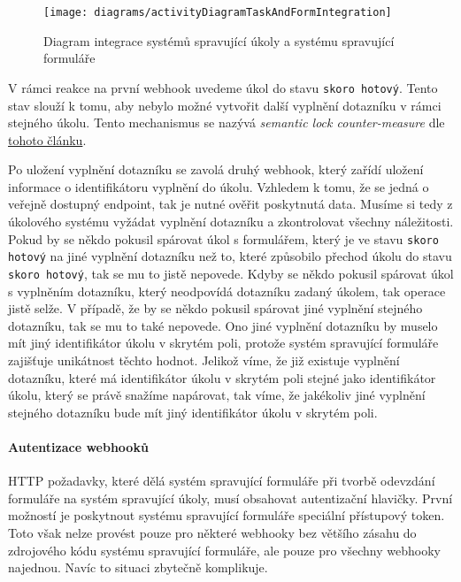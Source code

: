 \begin{figure}[H]
    \centering
    \texttt{[image: diagrams/activityDiagramTaskAndFormIntegration]}
    \caption{Diagram integrace systémů spravující úkoly a systému spravující formuláře}\label{fig:activity-diagram-task-and-form-integration}
\end{figure}

V rámci reakce na první webhook uvedeme úkol do stavu \texttt{skoro hotový}.
Tento stav slouží k tomu, aby nebylo možné vytvořit další vyplnění dotazníku v rámci stejného úkolu.
Tento mechanismus se nazývá \emph{semantic lock counter-measure} dle \href{https://microservices.io/post/microservices/2019/07/09/developing-sagas-part-1.html}{tohoto článku}.

Po uložení vyplnění dotazníku se zavolá druhý webhook, který zařídí uložení informace o identifikátoru vyplnění do úkolu.
Vzhledem k tomu, že se jedná o veřejně dostupný endpoint, tak je nutné ověřit poskytnutá data.
Musíme si tedy z úkolového systému vyžádat vyplnění dotazníku a zkontrolovat všechny náležitosti.
Pokud by se někdo pokusil spárovat úkol s formulářem, který je ve stavu \texttt{skoro hotový} na jiné vyplnění dotazníku než to, které způsobilo přechod úkolu do stavu \texttt{skoro hotový}, tak se mu to jistě nepovede.
Kdyby se někdo pokusil spárovat úkol s vyplněním dotazníku, který neodpovídá dotazníku zadaný úkolem, tak operace jistě selže.
V případě, že by se někdo pokusil spárovat jiné vyplnění stejného dotazníku, tak se mu to také nepovede.
Ono jiné vyplnění dotazníku by muselo mít jiný identifikátor úkolu v skrytém poli, protože systém spravující formuláře zajišťuje unikátnost těchto hodnot.
Jelikož víme, že již existuje vyplnění dotazníku, které má identifikátor úkolu v skrytém poli stejné jako identifikátor úkolu, který se právě snažíme napárovat, tak víme, že jakékoliv jiné vyplnění stejného dotazníku bude mít jiný identifikátor úkolu v skrytém poli.

\paragraph{Autentizace webhooků}

HTTP požadavky, které dělá systém spravující formuláře při tvorbě odevzdání formuláře na systém spravující úkoly, musí obsahovat autentizační hlavičky.
První možností je poskytnout systému spravující formuláře speciální přístupový token.
Toto však nelze provést pouze pro některé webhooky bez většího zásahu do zdrojového kódu systému spravující formuláře, ale pouze pro všechny webhooky najednou.
Navíc to situaci zbytečně komplikuje.

